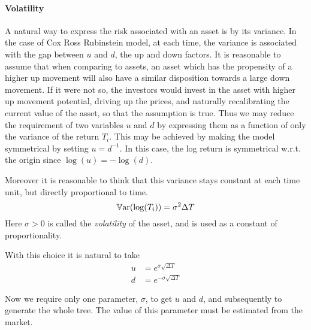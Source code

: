 \paragraph{Volatility}
A natural way to express the risk associated with an asset is by its variance. In the case of Cox Ross Rubinstein model, at each time, the variance is associated with the gap between $ u $ and $ d $, the up and down factors. It is reasonable to assume that when comparing to assets, an asset which has the propensity of a higher up movement will also have a similar disposition towards a large down movement. If it were not so, the investors would invest in the asset with higher up movement potential, driving up the prices, and naturally recalibrating the current value of the asset, so that the assumption is true. Thus we may reduce the requirement of two variables $ u $ and $ d $ by expressing them as a function of only the variance of the return $ T_i $. This may be achieved by making the model symmetrical by setting $ u = d^{-1} $. In this case, the log return is symmetrical w.r.t. the origin since $ \log (u) = - \log (d) $.

Moreover it is reasonable to think that this variance stays constant at each time unit, but directly proportional to time.
\begin{equation*}
	\operatorname{\mathbb{V}\mathrm{ar}}(\log(T_i)) = \sigma^2 \Delta T
\end{equation*}
Here $ \sigma > 0 $ is called the \emph{volatility} of the asset, and is used as a constant of proportionality.

With this choice it is natural to take
\begin{subequations}
	\label{eq:discrete-ud}
	\begin{align}
		u &= e^{\sigma \sqrt{\Delta T}} \\
		d &= e^{- \sigma \sqrt{\Delta T}}
	\end{align}
\end{subequations}

Now we require only one parameter, $ \sigma $, to get $ u $ and $ d $, and subsequently to generate the whole tree. The value of this parameter must be estimated from the market.



